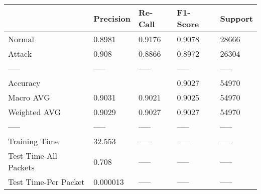 \begin{tabular}{lllll}
\toprule
{} & Precision & Re-Call & F1-Score & Support \\
\midrule
Normal                &    0.8981 &  0.9176 &   0.9078 &   28666 \\
Attack                &     0.908 &  0.8866 &   0.8972 &   26304 \\
-----                 &     ----- &   ----- &    ----- &   ----- \\
Accuracy              &           &         &   0.9027 &   54970 \\
Macro AVG             &    0.9031 &  0.9021 &   0.9025 &   54970 \\
Weighted AVG          &    0.9029 &  0.9027 &   0.9027 &   54970 \\
-----                 &     ----- &   ----- &    ----- &   ----- \\
Training Time         &    32.553 &   ----- &    ----- &   ----- \\
Test Time-All Packets &     0.708 &   ----- &    ----- &   ----- \\
Test Time-Per Packet  &  0.000013 &   ----- &    ----- &   ----- \\
\bottomrule
\end{tabular}
